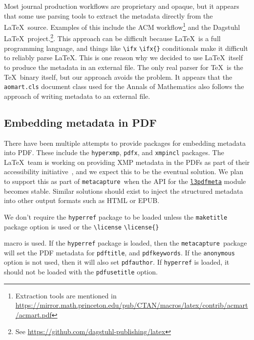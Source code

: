\documentclass{article}
\newcommand{\pkgname}{\texttt{metacapture}}
\newcommand{\cmd}[2][]{%
  \def\FirstArg{#1}%
  \ifx\FirstArg\empty%
    \texttt{\textbackslash{}#2}%
  \else%
    \texttt{\textbackslash{}#2\{#1\}}%
  \fi
}
\newcommand{\pkg}[1]{\texttt{#1}}
\begin{document}
Most journal production workflows are proprietary and opaque, but it
appears that some use parsing tools to extract the metadata directly
from the \LaTeX\ source. Examples of this include the ACM
workflow\footnote{Extraction tools are mentioned in
\url{https://mirror.math.princeton.edu/pub/CTAN/macros/latex/contrib/acmart/acmart.pdf}}
and the Dagstuhl \LaTeX\
project.\footnote{See \url{https://github.com/dagstuhl-publishing/latex}}. This
approach can be difficult because \LaTeX\ is a full programming
language, and things like \cmd{ifx} conditionals make it difficult to reliably parse \LaTeX.
This is one reason why we decided to use \LaTeX\ itself to
produce the metadata in an external file. The only real parser for \TeX\ is the \TeX\ binary
itself, but our approach avoids the problem. It appears that the \texttt{aomart.cls}
document class used for the Annals of Mathematics also follows the approach
of writing metadata to an external file.

\subsection{Embedding metadata in PDF}\label{pdfmetadata}
There have been multiple attempts to provide packages for embedding
metadata into PDF. These include the \texttt{hyperxmp}, \texttt{pdfx},
and \texttt{xmpincl} packages.  The \LaTeX\ team is working on
providing XMP metadata in the PDFs as part of their accessibility
initiative~\cite{xmpinlatex}, and we expect this to be the eventual
solution.  We plan to support this as part of \pkgname\ when the API
for the
\href{https://ctan.math.washington.edu/tex-archive/macros/latex/contrib/pdfmanagement-testphase/l3pdfmeta.pdf}{\texttt{l3pdfmeta}} module becomes stable. Similar solutions should exist to inject the structured
metadata into other output formats such as HTML or EPUB.

We don't require the \pkg{hyperref} package to be loaded unless
the \texttt{maketitle} package option is used or the \cmd{license}
macro is used. If the \pkg{hyperref} package is loaded, then the
\pkgname\ package will set the PDF metadata for \texttt{pdftitle},
and \texttt{pdfkeywords}. If the \texttt{anonymous} option is not used, then
it will also set \texttt{pdfauthor}. If \pkg{hyperref} is loaded, it
should not be loaded with the \pkg{pdfusetitle} option.
\end{document}
